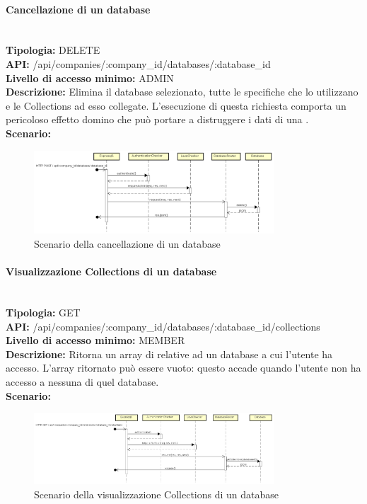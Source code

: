 \paragraph{Cancellazione di un database}\mbox{}\\
\textbf{Tipologia:} DELETE \\
\textbf{API:} /api/companies/:company\_id/databases/:database\_id \\
\textbf{Livello di accesso minimo:} ADMIN \\
\textbf{Descrizione:} Elimina il database selezionato, tutte le specifiche  che lo utilizzano e le Collections ad esso collegate. L'esecuzione di questa richiesta comporta un pericoloso effetto domino che può portare a distruggere i dati di una . \\
\textbf{Scenario:} 
\begin{figure}[H]
\centering
\includegraphics[width=0.8\textwidth]{res/sections/backend/sequence/(DELETE)database.png}
\caption{Scenario della cancellazione di un database}
\end{figure}

\newpage
\paragraph{Visualizzazione Collections di un database} \mbox{}\\
\textbf{Tipologia:} GET \\
\textbf{API:} /api/companies/:company\_id/databases/:database\_id/collections \\
\textbf{Livello di accesso minimo:} MEMBER \\
\textbf{Descrizione:} Ritorna un array di  relative ad un database a cui l'utente ha accesso. L'array ritornato può essere vuoto: questo accade quando l'utente non ha accesso a nessuna  di quel database. \\
\textbf{Scenario:} 
\begin{figure}[H]
\centering
\includegraphics[width=0.8\textwidth]{res/sections/backend/sequence/(GET)collection.png}
\caption{Scenario della visualizzazione Collections di un database}
\end{figure}

